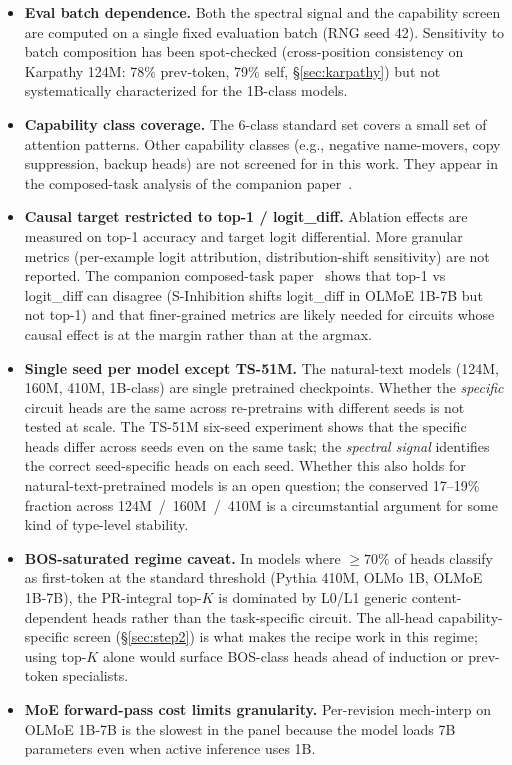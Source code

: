 \documentclass[11pt]{article}
\begin{document}
\begin{itemize}[leftmargin=*,topsep=2pt,itemsep=2pt]
\item \textbf{Eval batch dependence.} Both the spectral signal and the capability screen are computed on a single fixed evaluation batch (RNG seed 42). Sensitivity to batch composition has been spot-checked (cross-position consistency on Karpathy 124M: 78\% prev-token, 79\% self, \S\ref{sec:karpathy}) but not systematically characterized for the 1B-class models.

\item \textbf{Capability class coverage.} The 6-class standard set covers a small set of attention patterns. Other capability classes (e.g., negative name-movers, copy suppression, backup heads) are not screened for in this work. They appear in the composed-task analysis of the companion paper~\citep{paper3_circuits}.

\item \textbf{Causal target restricted to top-1 / logit\_diff.} Ablation effects are measured on top-1 accuracy and target logit differential. More granular metrics (per-example logit attribution, distribution-shift sensitivity) are not reported. The companion composed-task paper~\citep{paper3_circuits} shows that top-1 vs logit\_diff can disagree (S-Inhibition shifts logit\_diff in OLMoE 1B-7B but not top-1) and that finer-grained metrics are likely needed for circuits whose causal effect is at the margin rather than at the argmax.

\item \textbf{Single seed per model except TS-51M.} The natural-text models (124M, 160M, 410M, 1B-class) are single pretrained checkpoints. Whether the \emph{specific} circuit heads are the same across re-pretrains with different seeds is not tested at scale. The TS-51M six-seed experiment shows that the specific heads differ across seeds even on the same task; the \emph{spectral signal} identifies the correct seed-specific heads on each seed. Whether this also holds for natural-text-pretrained models is an open question; the conserved 17--19\% fraction across 124M~/~160M~/~410M is a circumstantial argument for some kind of type-level stability.

\item \textbf{BOS-saturated regime caveat.} In models where $\geq 70\%$ of heads classify as first-token at the standard threshold (Pythia 410M, OLMo 1B, OLMoE 1B-7B), the PR-integral top-$K$ is dominated by L0/L1 generic content-dependent heads rather than the task-specific circuit. The all-head capability-specific screen (\S\ref{sec:step2}) is what makes the recipe work in this regime; using top-$K$ alone would surface BOS-class heads ahead of induction or prev-token specialists.

\item \textbf{MoE forward-pass cost limits granularity.} Per-revision mech-interp on OLMoE 1B-7B is the slowest in the panel because the model loads 7B parameters even when active inference uses 1B.
\end{itemize}
\end{document}
